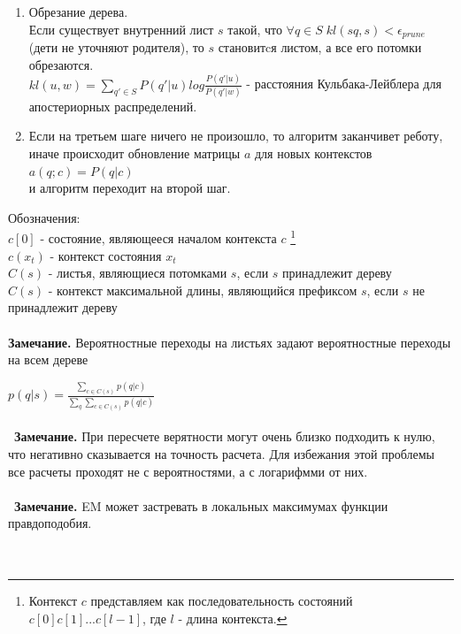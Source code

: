 \documentclass[10pt,a4paper]{article}
\begin{document}
\begin{enumerate}
\item Обрезание дерева.
\\
Если существует внутренний лист $ s $ такой, что $ \forall q \in S \; kl(sq, s) < \epsilon_{prune} $ (дети не уточняют родителя), то $ s $ становитcя листом, а все его потомки обрезаются.
\\
$kl(u, w) = \sum_{q' \in S} P(q'|u) log\frac{P(q'|u)}{P(q'|w)}$ - расстояния Кульбака-Лейблера для апостериорных распределений.
\\
\item Если на третьем шаге ничего не произошло, то алгоритм заканчивет реботу, 
иначе происходит обновление матрицы $ a $ для новых контекстов
\\
$ a(q; c) = P(q| c)$
\\
и алгоритм переходит на второй шаг.
\\
\end{enumerate}
Обозначения: 
\\
$ c[0] $ - состояние, являющееся началом контекста $ c $
\footnote{Контекст $ c $ представляем как последовательность состояний $c[0]c[1]...c[l-1]$, где $ l $ - длина контекста.}
\\
$ c(x_{t}) $ - контекст состояния $ x_{t} $ 
\\
$ C(s) $ - листья, являющиеся потомками $ s $, если $ s $ принадлежит дереву 
\\
$ C(s) $ - контекст максимальной длины, являющийся префиксом $ s $, если $ s $ не принадлежит дереву 
\\\\
\textbf{Замечание.}  Вероятностные переходы на листьях задают вероятностные переходы на всем дереве

$ p(q|s) = \frac{\sum_{c \in C(s)} {p(q|c)}}{\sum_q\sum_{c \in C(s)} {p(q|c)}} $ 
\\\\\
\textbf{Замечание.} При пересчете верятности могут очень близко подходить к нулю, что негативно сказывается на точность расчета. Для избежания этой проблемы все расчеты проходят не с вероятностями, а с логарифмми от них.
\\\\\
\textbf{Замечание.} EM может застревать в локальных максимумах функции правдоподобия.
\\\\\
\end{document}
